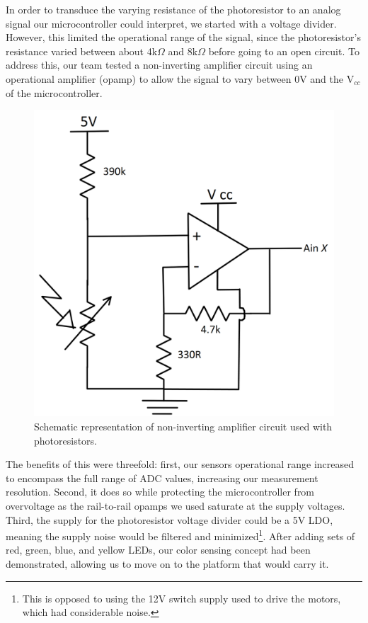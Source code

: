 \documentclass[12pt]{article}
\begin{document}
\begin{multicols*}{2}
            In order to transduce the varying resistance of the photoresistor to an analog signal our microcontroller could interpret, we started with a voltage divider. However, this limited the operational range of the signal, since the photoresistor's resistance varied between about 4k$\Omega$ and 8k$\Omega$ before going to an open circuit. To address this, our team tested a non-inverting amplifier circuit using an operational amplifier (opamp) to allow the signal to vary between 0V and the V$_{cc}$ of the microcontroller. 
            
            \begin{figure}[H]
                \centering\includegraphics[width=0.7\linewidth]{OpAmpSch.PNG}
                \captionsetup{width=\linewidth}
                \caption{Schematic representation of non-inverting amplifier circuit used with photoresistors.}
                \label{fig:opamp}
            \end{figure}

            The benefits of this were threefold: first, our sensors operational range increased to encompass the full range of ADC values, increasing our measurement resolution. Second, it does so while protecting the microcontroller from overvoltage as the rail-to-rail opamps we used saturate at the supply voltages. Third, the supply for the photoresistor voltage divider could be a 5V LDO, meaning the supply noise would be filtered and minimized\footnote{This is opposed to using the 12V switch supply used to drive the motors, which had considerable noise.}. After adding sets of red, green, blue, and yellow LEDs, our color sensing concept had been demonstrated, allowing us to move on to the platform that would carry it. 


\end{multicols*}
\end{document}
